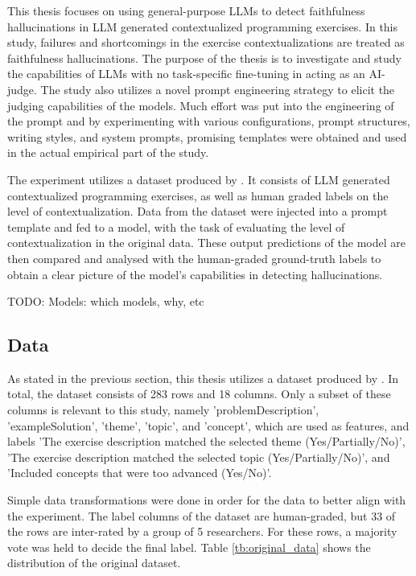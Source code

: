 \documentclass[english, 12pt, a4paper, sci, utf8, a-2b, online]{../definitions/aaltothesis}
\begin{document}
This thesis focuses on using general-purpose LLMs to detect faithfulness hallucinations in LLM generated contextualized programming exercises. In this study, failures and shortcomings in the exercise contextualizations are treated as faithfulness hallucinations. The purpose of the thesis is to investigate and study the capabilities of LLMs with no task-specific fine-tuning in acting as an AI-judge. The study also utilizes a novel prompt engineering strategy to elicit the judging capabilities of the models. Much effort was put into the engineering of the prompt and by experimenting with various configurations, prompt structures, writing styles, and system prompts, promising templates were obtained and used in the actual empirical part of the study.

The experiment utilizes a dataset produced by \textcite{10.1145/3632620.3671103}. It consists of LLM generated contextualized programming exercises, as well as human graded labels on the level of contextualization. Data from the dataset were injected into a prompt template and fed to a model, with the task of evaluating the level of contextualization in the original data. These output predictions of the model are then compared and analysed with the human-graded ground-truth labels to obtain a clear picture of the model's capabilities in detecting hallucinations.

TODO: Models: which models, why, etc

\subsection{Data}

As stated in the previous section, this thesis utilizes a dataset produced by \textcite{10.1145/3632620.3671103}. In total, the dataset consists of 283 rows and 18 columns. Only a subset of these columns is relevant to this study, namely 'problemDescription', 'exampleSolution', 'theme', 'topic', and 'concept', which are used as features, and labels 'The exercise description matched the selected theme (Yes/Partially/No)', 'The exercise description matched the selected topic (Yes/Partially/No)', and 'Included concepts that were too advanced (Yes/No)'.

Simple data transformations were done in order for the data to better align with the experiment. The label columns of the dataset are human-graded, but 33 of the rows are inter-rated by a group of 5 researchers. For these rows, a majority vote was held to decide the final label. Table \ref{tb:original_data} shows the distribution of the original dataset.
\end{document}
